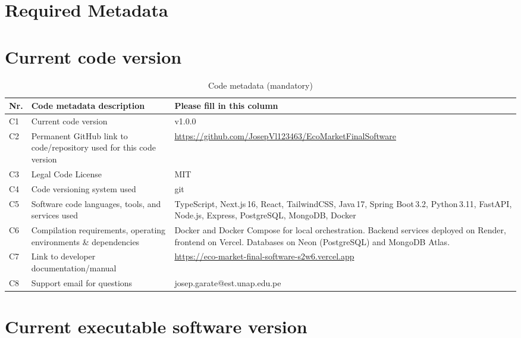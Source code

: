 \documentclass[preprint,12pt,a4paper]{elsarticle}
\begin{document}
\vspace{0.5cm}

\section*{Required Metadata}

\section*{Current code version}

\begin{table}[!h]
\begin{tabular}{|l|p{5.8cm}|p{6.5cm}|}
\hline
\textbf{Nr.} & \textbf{Code metadata description} & \textbf{Please fill in this column} \\
\hline
C1 & Current code version & v1.0.0 \\
\hline
C2 & Permanent GitHub link to code/repository used for this code version &
     \url{https://github.com/JosepVl123463/EcoMarketFinalSoftware} \\
\hline
C3 & Legal Code License & MIT \\
\hline
C4 & Code versioning system used & git \\
\hline
C5 & Software code languages, tools, and services used &
     TypeScript, Next.js\,16, React, TailwindCSS, Java\,17, Spring Boot\,3.2, Python\,3.11, FastAPI, Node.js, Express, PostgreSQL, MongoDB, Docker \\
\hline
C6 & Compilation requirements, operating environments \& dependencies &
     Docker and Docker Compose for local orchestration. Backend services deployed on Render, frontend on Vercel. Databases on Neon (PostgreSQL) and MongoDB Atlas. \\
\hline
C7 & Link to developer documentation/manual &
     \url{https://eco-market-final-software-s2w6.vercel.app} \\
\hline
C8 & Support email for questions & josep.garate@est.unap.edu.pe \\
\hline
\end{tabular}
\caption{Code metadata (mandatory)}
\label{tab:code-metadata}
\end{table}

\section*{Current executable software version}
\end{document}
